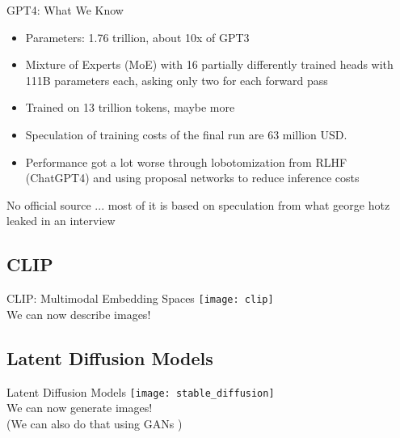 \begin{frame}[c]{GPT4: What We Know}
    \begin{itemize}[<+(1)->]
        \item Parameters: 1.76 trillion, about 10x of GPT3
        \item Mixture of Experts (MoE) with 16 partially differently trained
            heads with 111B parameters each, asking only two for each forward
            pass
        \item Trained on 13 trillion tokens, maybe more
        \item Speculation of training costs of the final run are 63 million USD.
        \item Performance got a lot worse through lobotomization from RLHF (ChatGPT4) and using proposal networks to reduce inference costs
    \end{itemize}
    \pause
    No official source ... most of it is based on speculation from what george hotz leaked in an interview \cite{transhumanismvideos_george_2023}
\end{frame}

\subsection{CLIP}
\begin{frame}[c]{CLIP: Multimodal Embedding Spaces}
    \texttt{[image: clip]} \\
    \large We can now describe images!
\end{frame}

\subsection{Latent Diffusion Models}
\begin{frame}[c]{Latent Diffusion Models}
    \texttt{[image: stable\_diffusion]} \\
    \large We can now generate images! \\
    \normalsize
    (We can also do that using GANs \cite{esser_taming_2021})
\end{frame}

